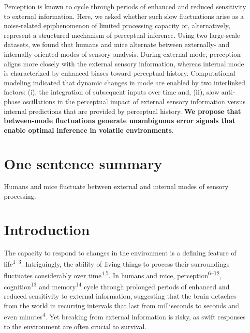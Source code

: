 \documentclass[
]{article}
\begin{document}
Perception is known to cycle through periods of enhanced and reduced
sensitivity to external information. Here, we asked whether such slow
fluctuations arise as a noise-related epiphenomenon of limited
processing capacity or, alternatively, represent a structured mechanism
of perceptual inference. Using two large-scale datasets, we found that
humans and mice alternate between externally- and internally-oriented
modes of sensory analysis. During external mode, perception aligns more
closely with the external sensory information, whereas internal mode is
characterized by enhanced biases toward perceptual history.
Computational modeling indicated that dynamic changes in mode are
enabled by two interlinked factors: (i), the integration of subsequent
inputs over time and, (ii), slow anti-phase oscillations in the
perceptual impact of external sensory information versus internal
predictions that are provided by perceptual history. \textbf{We propose
that between-mode fluctuations generate unambiguous error signals that
enable optimal inference in volatile environments.}

\hypertarget{one-sentence-summary}{%
\section{One sentence summary}\label{one-sentence-summary}}

Humans and mice fluctuate between external and internal modes of sensory
processing.

\hfill\break

\newpage

\hypertarget{introduction}{%
\section{Introduction}\label{introduction}}

The capacity to respond to changes in the environment is a defining
feature of life\textsuperscript{1--3}. Intriguingly, the ability of
living things to process their surroundings fluctuates considerably over
time\textsuperscript{4,5}. In humans and mice,
perception\textsuperscript{6--12}, cognition\textsuperscript{13} and
memory\textsuperscript{14} cycle through prolonged periods of enhanced
and reduced sensitivity to external information, suggesting that the
brain detaches from the world in recurring intervals that last from
milliseconds to seconds and even minutes\textsuperscript{4}. Yet
breaking from external information is risky, as swift responses to the
environment are often crucial to survival.
\end{document}
